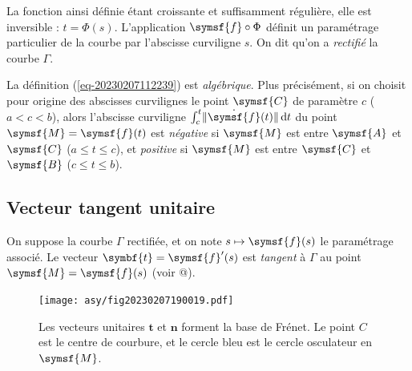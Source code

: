 \documentclass[
  a4paper,
  DIV=11,
  numbers=noendperiod]{scrreprt}
\newcommand{\D}{{\mathrm d}}
\newcommand{\point}[1]{\symsf{#1}}
\renewcommand{\vec}[1]{\symbf{#1}}
\begin{document}
La fonction ainsi définie étant croissante et suffisamment régulière,
elle est inversible : \(t = \Phi(s)\). L'application
\(\point{f} \circ \Phi\) définit un paramétrage particulier de la courbe
par l'abscisse curviligne \(s\). On dit qu'on a \emph{rectifié} la
courbe \(\Gamma\).

\begin{tcolorbox}[enhanced jigsaw, toprule=.15mm, breakable, left=2mm, rightrule=.15mm, colbacktitle=quarto-callout-note-color!10!white, colframe=quarto-callout-note-color-frame, title=\textcolor{quarto-callout-note-color}{\faInfo}\hspace{0.5em}{Note}, bottomtitle=1mm, arc=.35mm, coltitle=black, opacityback=0, leftrule=.75mm, titlerule=0mm, toptitle=1mm, bottomrule=.15mm, opacitybacktitle=0.6, colback=white]

La définition (\ref{eq-20230207112239}) est \emph{algébrique}. Plus
précisément, si on choisit pour origine des abscisses curvilignes le
point \(\point{C}\) de paramètre \(c\) (\(a < c < b\)), alors l'abscisse
curviligne \(\int_c^t \lVert \dot{\point{f}}(t) \rVert \, \D t\) du
point \(\point{M} = \point{f}(t)\) est \emph{négative} si \(\point{M}\)
est entre \(\point{A}\) et \(\point{C}\) (\(a \leq t \leq c\)), et
\emph{positive} si \(\point{M}\) est entre \(\point{C}\) et
\(\point{B}\) (\(c \leq t \leq b\)).

\end{tcolorbox}

\hypertarget{sec-20230207114551}{%
\subsection{Vecteur tangent unitaire}\label{sec-20230207114551}}

On suppose la courbe \(\Gamma\) rectifiée, et on note
\(s \mapsto \point{f}(s)\) le paramétrage associé. Le vecteur
\(\vec{t} = \point{f}'(s)\) est \emph{tangent} à \(\Gamma\) au point
\(\point{M} = \point{f}(s)\) (voir @).

\begin{figure}

{\centering \texttt{[image: asy/fig20230207190019.pdf]}

}

\caption{\label{fig-20230207190019}Les vecteurs unitaires \(\vec t\) et
\(\vec n\) forment la base de Frénet. Le point \(C\) est le centre de
courbure, et le cercle bleu est le cercle osculateur en \(\point{M}\).}

\end{figure}
\end{document}
